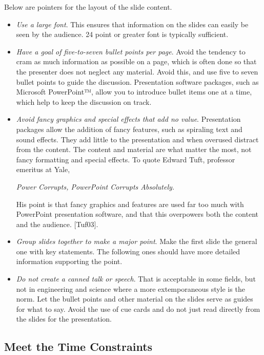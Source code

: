 Below are pointers for the layout of the slide content.

\begin{itemize}
\item
  \emph{Use a large font}. This ensures that information on the slides
  can easily be seen by the audience. 24 point or greater font is
  typically sufficient.
\item
  \emph{Have a goal of five-to-seven bullet points per page}. Avoid the
  tendency to cram as much information as possible on a page, which is
  often done so that the presenter does not neglect any material. Avoid
  this, and use five to seven bullet points to guide the discussion.
  Presentation software packages, such as Microsoft PowerPoint™, allow
  you to introduce bullet items one at a time, which help to keep the
  discussion on track.
\item
  \emph{Avoid fancy graphics and special effects that add no value}.
  Presentation packages allow the addition of fancy features, such as
  spiraling text and sound effects. They add little to the presentation
  and when overused distract from the content. The content and material
  are what matter the most, not fancy formatting and special effects. To
  quote Edward Tuft, professor emeritus at Yale,

  \emph{Power Corrupts, PowerPoint Corrupts Absolutely.}

  His point is that fancy graphics and features are used far too much
  with PowerPoint presentation software, and that this overpowers both
  the content and the audience. {[}Tuf03{]}.
\item
  \emph{Group slides together to make a major point}. Make the first
  slide the general one with key statements. The following ones should
  have more detailed information supporting the point.
\item
  \emph{Do not create a canned talk or speech}. That is acceptable in
  some fields, but not in engineering and science where a more
  extemporaneous style is the norm. Let the bullet points and other
  material on the slides serve as guides for what to say. Avoid the use
  of cue cards and do not just read directly from the slides for the
  presentation.
\end{itemize}

\subsection*{Meet the Time Constraints}
\label{subsection:meet-the-time-constraints}


